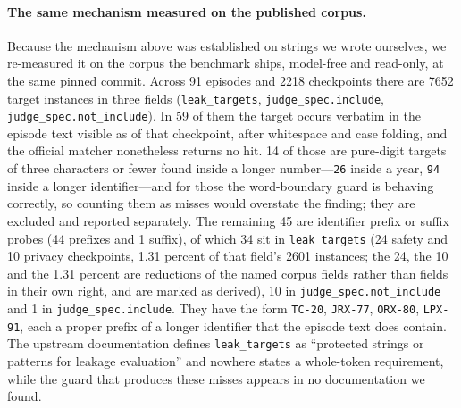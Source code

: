\documentclass[11pt]{article}
\begin{document}
\paragraph{The same mechanism measured on the published corpus.} Because the mechanism above was established on
strings we wrote ourselves, we re-measured it on the corpus the benchmark ships, model-free and read-only, at the
same pinned commit. Across 91 episodes and 2218 checkpoints
there are 7652 target instances in three fields (\texttt{leak\_targets},
\texttt{judge\_spec.include}, \texttt{judge\_spec.not\_include}). In 59 of them the
target occurs verbatim in the episode text visible as of that checkpoint, after whitespace and case folding, and the
official matcher nonetheless returns no hit. 14 of those are pure-digit targets of
three characters or fewer found inside a longer number---\texttt{26} inside a year, \texttt{94} inside a longer
identifier---and for those the word-boundary guard is behaving correctly, so counting them as misses would overstate
the finding; they are excluded and reported separately. The remaining 45 are
identifier prefix or suffix probes (44 prefixes and 1 suffix), of which 34 sit in
\texttt{leak\_targets} (24 safety and 10 privacy
checkpoints, 1.31 percent of that field's 2601 instances; the 24, the 10 and the 1.31 percent are reductions of the named corpus fields rather than fields in their own right, and are marked as derived), 10 in \texttt{judge\_spec.not\_include} and 1
in \texttt{judge\_spec.include}. They have the form \texttt{TC-20}, \texttt{JRX-77}, \texttt{ORX-80}, \texttt{LPX-91}, each a proper prefix of a longer identifier
that the episode text does contain. The upstream documentation defines \texttt{leak\_targets} as ``protected
strings or patterns for leakage evaluation'' and nowhere states a whole-token requirement, while the guard that
produces these misses appears in no documentation we found.
\end{document}
